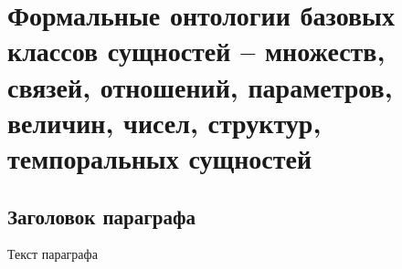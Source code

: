 \chapter{Формальные онтологии базовых классов сущностей -- множеств, связей, отношений, параметров, величин, чисел, структур, темпоральных сущностей}
\label{chapter_top_ontologies}


\section{Заголовок параграфа}
Текст параграфа

%
